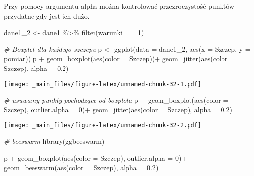 \documentclass[
]{book}
\newenvironment{Shaded}{\begin{snugshade}}{\end{snugshade}}
\newcommand{\AttributeTok}[1]{\textcolor[rgb]{0.77,0.63,0.00}{#1}}
\newcommand{\CommentTok}[1]{\textcolor[rgb]{0.56,0.35,0.01}{\textit{#1}}}
\newcommand{\DecValTok}[1]{\textcolor[rgb]{0.00,0.00,0.81}{#1}}
\newcommand{\FloatTok}[1]{\textcolor[rgb]{0.00,0.00,0.81}{#1}}
\newcommand{\FunctionTok}[1]{\textcolor[rgb]{0.00,0.00,0.00}{#1}}
\newcommand{\NormalTok}[1]{#1}
\newcommand{\OtherTok}[1]{\textcolor[rgb]{0.56,0.35,0.01}{#1}}
\newcommand{\SpecialCharTok}[1]{\textcolor[rgb]{0.00,0.00,0.00}{#1}}
\begin{document}
Przy pomocy argumentu alpha można kontrolować przezroczystość punktów - przydatne gdy jest ich dużo.

\begin{Shaded}
\begin{Highlighting}[]
\NormalTok{dane1\_2 }\OtherTok{\textless{}{-}}\NormalTok{ dane1 }\SpecialCharTok{\%\textgreater{}\%} \FunctionTok{filter}\NormalTok{(warunki }\SpecialCharTok{==} \DecValTok{1}\NormalTok{)}

\CommentTok{\# Boxplot dla każdego szczepu}
\NormalTok{p }\OtherTok{\textless{}{-}} \FunctionTok{ggplot}\NormalTok{(}\AttributeTok{data =}\NormalTok{ dane1\_2, }\FunctionTok{aes}\NormalTok{(}\AttributeTok{x =}\NormalTok{ Szczep, }\AttributeTok{y =}\NormalTok{ pomiar))}
\NormalTok{p }\SpecialCharTok{+} \FunctionTok{geom\_boxplot}\NormalTok{(}\FunctionTok{aes}\NormalTok{(}\AttributeTok{color =}\NormalTok{ Szczep))}\SpecialCharTok{+}
  \FunctionTok{geom\_jitter}\NormalTok{(}\FunctionTok{aes}\NormalTok{(}\AttributeTok{color =}\NormalTok{ Szczep), }\AttributeTok{alpha =} \FloatTok{0.2}\NormalTok{)}
\end{Highlighting}
\end{Shaded}

\texttt{[image: \_main\_files/figure-latex/unnamed-chunk-32-1.pdf]}

\begin{Shaded}
\begin{Highlighting}[]
\CommentTok{\# usuwamy punkty pochodzące od boxplota}
\NormalTok{p }\SpecialCharTok{+} \FunctionTok{geom\_boxplot}\NormalTok{(}\FunctionTok{aes}\NormalTok{(}\AttributeTok{color =}\NormalTok{ Szczep), }\AttributeTok{outlier.alpha =} \DecValTok{0}\NormalTok{)}\SpecialCharTok{+}
  \FunctionTok{geom\_jitter}\NormalTok{(}\FunctionTok{aes}\NormalTok{(}\AttributeTok{color =}\NormalTok{ Szczep), }\AttributeTok{alpha =} \FloatTok{0.2}\NormalTok{)}
\end{Highlighting}
\end{Shaded}

\texttt{[image: \_main\_files/figure-latex/unnamed-chunk-32-2.pdf]}

\begin{Shaded}
\begin{Highlighting}[]
\CommentTok{\# beeswarm}
\FunctionTok{library}\NormalTok{(ggbeeswarm)}

\NormalTok{p }\SpecialCharTok{+} \FunctionTok{geom\_boxplot}\NormalTok{(}\FunctionTok{aes}\NormalTok{(}\AttributeTok{color =}\NormalTok{ Szczep), }\AttributeTok{outlier.alpha =} \DecValTok{0}\NormalTok{)}\SpecialCharTok{+}
  \FunctionTok{geom\_beeswarm}\NormalTok{(}\FunctionTok{aes}\NormalTok{(}\AttributeTok{color =}\NormalTok{ Szczep), }\AttributeTok{alpha =} \FloatTok{0.2}\NormalTok{)}
\end{Highlighting}
\end{Shaded}
\end{document}
